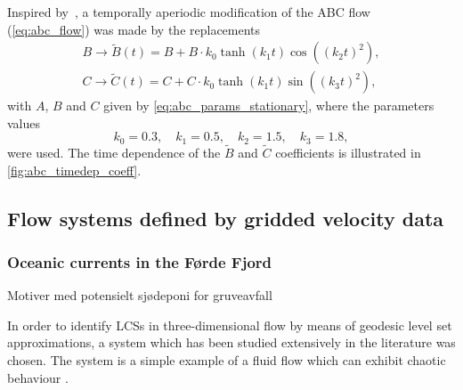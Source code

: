 Inspired by~\textcite{oettinger2016autonomous}, a temporally aperiodic
modification of the ABC flow (\cref{eq:abc_flow}) was made by the replacements
\begin{equation}
    \label{eq:abc_params_nonstationary}
    \begin{gathered}
    B\to{}\widetilde{B}(t) = B + B\cdot{}k_{0}\tanh(k_{1}t)\cos({({k_{2}t})}^{2}),\\
    C\to{}\widetilde{C}(t) = C + C\cdot{}k_{0}\tanh(k_{1}t)\sin({({k_{3}t})}^{2}),
    \end{gathered}
\end{equation}
with $A$, $B$ and $C$ given by \cref{eq:abc_params_stationary}, where the
parameters values
\begin{equation}
    \label{eq:abc_params_nonstationary_frequencies}
    k_{0}=0.3,\quad k_{1}=0.5,\quad k_{2}=1.5,\quad k_{3}=1.8,
\end{equation}
were used. The time dependence of the $\widetilde{B}$ and $\widetilde{C}$
coefficients is illustrated in \cref{fig:abc_timedep_coeff}.



\subsection{Flow systems defined by gridded velocity data}
\label{sub:flow_systems_defined_by_gridded_velocity_data}

\subsubsection{Oceanic currents in the Førde Fjord}
\label{ssub:oceanic_currents_in_the_forde_fjord}

\begin{framed}
    Motiver med potensielt sjødeponi for gruveavfall
\end{framed}




In order to identify LCSs in three-dimensional flow by means of geodesic level
set approximations, a system which has been studied extensively in the
literature was chosen. The system is a simple example of a fluid flow which can
exhibit chaotic behaviour \parencite[p.204]{frisch1995turbulence}.
